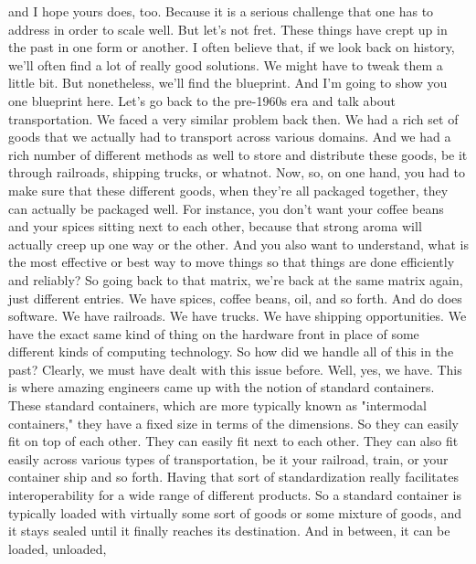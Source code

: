 {{{{{    and I hope yours does, too.
    Because it is a serious challenge that one
    has to address in order to scale well.
    But let's not fret.
    These things have crept up in the past in one form or another.
    I often believe that, if we look back on history,
    we'll often find a lot of really good solutions.
    We might have to tweak them a little bit.
    But nonetheless, we'll find the blueprint.
    And I'm going to show you one blueprint here.
    Let's go back to the pre-1960s era and talk about transportation.
    We faced a very similar problem back then.
    We had a rich set of goods that we actually had
    to transport across various domains.
    And we had a rich number of different methods
    as well to store and distribute these goods,
    be it through railroads, shipping trucks, or whatnot.
    Now, so, on one hand, you had to make sure
    that these different goods, when they're all packaged together,
    they can actually be packaged well.
    For instance, you don't want your coffee beans and your spices sitting next
    to each other, because that strong aroma will actually
    creep up one way or the other.
    And you also want to understand, what is the most effective or best way
    to move things so that things are done efficiently and reliably?
    So going back to that matrix, we're back at the same matrix
    again, just different entries.
    We have spices, coffee beans, oil, and so forth.
    And do does software.
    We have railroads.
    We have trucks.
    We have shipping opportunities.
    We have the exact same kind of thing on the hardware front
    in place of some different kinds of computing technology.
    So how did we handle all of this in the past?
    Clearly, we must have dealt with this issue before.
    Well, yes, we have.
    This is where amazing engineers came up with the notion of standard containers.
    These standard containers, which are more typically known
    as "intermodal containers," they have a fixed size in terms of the dimensions.
    So they can easily fit on top of each other.
    They can easily fit next to each other.
    They can also fit easily across various types of transportation,
    be it your railroad, train, or your container ship and so forth.
    Having that sort of standardization really
    facilitates interoperability for a wide range of different products.
    So a standard container is typically loaded
    with virtually some sort of goods or some mixture of goods,
    and it stays sealed until it finally reaches its destination.
    And in between, it can be loaded, unloaded,
}}}}}
